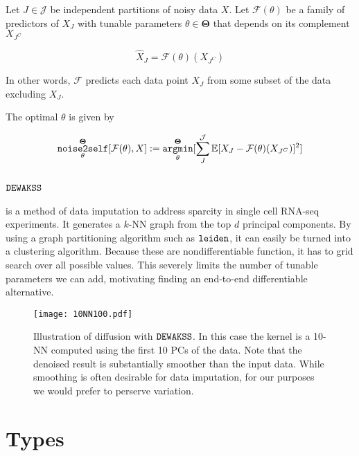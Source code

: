 Let $J \in \mathcal{J}$ be independent partitions of noisy data $X$. Let $\mathcal{F}(\theta)$ be a family of predictors of $X_J$ with tunable parameters $\theta \in \mathbf{\Theta}$ that depends on its complement $X_{J^C}$

\begin{equation}
  \hat{X}_J=\mathcal{F}(\theta)(X_{J^C})
\end{equation}

In other words, $\mathcal{F}$ predicts each data point $X_J$ from some subset of the data excluding $X_J$. 

  The optimal $\theta$ is given by

\begin{equation}
  \label{eq:ntos}
  \mathop{\mathtt{noise2self}}\limits_\theta^{\mathbf{\Theta}}[\mathcal{F}(\theta),X] := \mathop{\mathtt{argmin}}\limits_\theta^{\mathbf{\Theta}}[\sum_{J}^{\mathcal{J}}\mathbb{E}[X_J-\mathcal{F}(\theta)(X_{J^C})]^2]
\end{equation}

\subsection{$\mathop{\mathtt{DEWAKSS}}\limits$}
\label{app:DEWAKSS}
\DEWAKSS\cite{tjarnberg2021} is a method of data imputation to address sparcity in single cell RNA-seq experiments.
It generates a $k$-NN graph from the top $d$ principal components.
By using a graph partitioning algorithm such as $\mathop{\mathtt{leiden}}\limits$\cite{DBLP:journals/corr/abs-1810-08473},
it can easily be turned into a clustering algorithm.
Because these are nondifferentiable function, it has to grid search over all possible values.
This severely limits the number of tunable parameters we can add, motivating finding an end-to-end differentiable alternative.

\begin{figure}
  \texttt{[image: 10NN100.pdf]}
  \caption{Illustration of diffusion with $\mathop{\mathtt{DEWAKSS}}\limits$. In this case the kernel is a 10-NN computed using the first 10 PCs of the data. Note that the denoised result is substantially smoother than the input data. While smoothing is often desirable for data imputation, for our purposes we would prefer to perserve variation.}
  \label{fig:diffusion}
\end{figure}





\section{Types}

